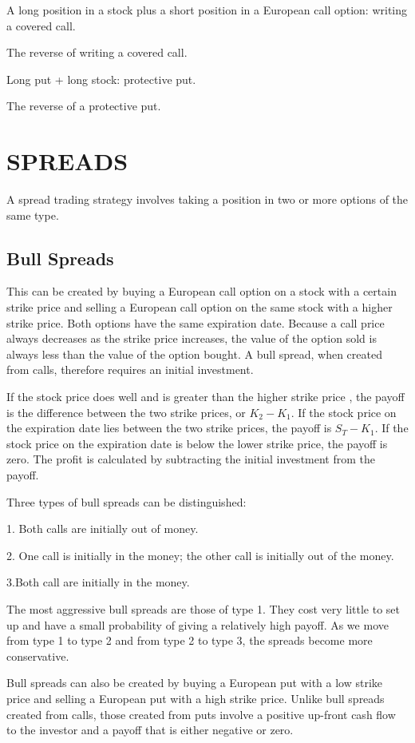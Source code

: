 \documentclass{article}
\begin{document}
A long position in a stock plus a short position in a European call option: writing a covered call.

The reverse of writing a covered call.

Long put + long stock: protective put.

The reverse of a protective put.

\section{SPREADS}
A spread trading strategy involves taking a position in two or more options of the same type.
\subsection{Bull Spreads}
This can be created by buying a European call option on a stock with a certain strike price and selling a European call option on the same stock with a higher strike price. Both options have the same expiration date. Because a call price always decreases as the strike price increases, the value of the option sold is always less than the value of the option bought. A bull spread, when created from calls, therefore requires an initial investment.

If the stock price does well and is greater than the higher strike price , the payoff is the difference between the two strike prices, or $ K_2-K_1 $. If the stock price on the expiration date lies between the two strike prices, the payoff is $ S_T-K_1 $. If the stock price on the expiration date is below the lower strike price, the payoff is zero. The profit is calculated by subtracting the initial investment from the payoff.

Three types of bull spreads can be distinguished:

1. Both calls are initially out of money.

2. One call is initially in the money; the other call is initially out of the money.

3.Both call are initially in the money.

The most aggressive bull spreads are those of type 1. They cost very little to set up and have a small probability of giving a relatively high payoff. As we move from type 1 to type 2 and from type 2 to type 3, the spreads become more conservative.

Bull spreads can also be created by buying a European put with a low strike price and selling a European put with a high strike price. Unlike bull spreads created from calls, those created from puts involve a positive up-front cash flow to the investor and a payoff that is either negative or zero.
\end{document}
